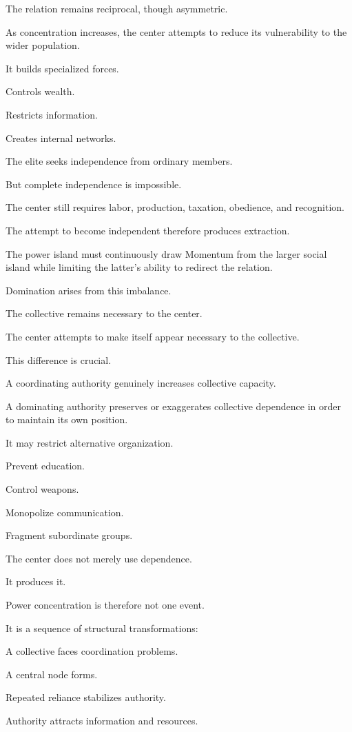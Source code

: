 The relation remains reciprocal, though asymmetric.

As concentration increases, the center attempts to reduce its vulnerability to the wider population.

It builds specialized forces.

Controls wealth.

Restricts information.

Creates internal networks.

The elite seeks independence from ordinary members.

But complete independence is impossible.

The center still requires labor, production, taxation, obedience, and recognition.

The attempt to become independent therefore produces extraction.

The power island must continuously draw Momentum from the larger social island while limiting the latter’s ability to redirect the relation.

Domination arises from this imbalance.

The collective remains necessary to the center.

The center attempts to make itself appear necessary to the collective.

This difference is crucial.

A coordinating authority genuinely increases collective capacity.

A dominating authority preserves or exaggerates collective dependence in order to maintain its own position.

It may restrict alternative organization.

Prevent education.

Control weapons.

Monopolize communication.

Fragment subordinate groups.

The center does not merely use dependence.

It produces it.

Power concentration is therefore not one event.

It is a sequence of structural transformations:

A collective faces coordination problems.

A central node forms.

Repeated reliance stabilizes authority.

Authority attracts information and resources.

